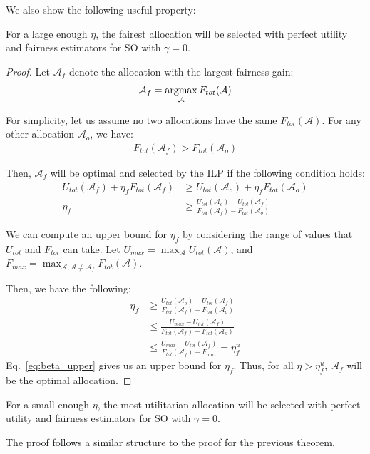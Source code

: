 We also show the following useful property:
\begin{theorem}
    For a large enough $\eta$, the fairest allocation will be selected with perfect utility and fairness estimators for SO with $\gamma=0$.
\end{theorem}
\begin{proof}
Let $\mathcal{A}_f$ denote the allocation with the largest fairness gain:
\begin{align*}
    \mathcal{A}_f = \argmax_\mathcal{A} F_{tot}(\mathcal{A}) 
\end{align*}

For simplicity, let us assume no two allocations have the same $F_{tot}(\mathcal{A})$. For any other allocation $\mathcal{A}_o$, we have:
\begin{align}
    F_{tot}(\mathcal{A}_f) > F_{tot}(\mathcal{A}_o)  
\end{align}

Then, $\mathcal{A}_f$ will be optimal and selected by the ILP if the following condition holds:
\begin{align}
  U_{tot}(\mathcal{A}_f) + \eta_f F_{tot}(\mathcal{A}_f) &\ge U_{tot}(\mathcal{A}_o) + \eta_f F_{tot}(\mathcal{A}_o)  \\
  \eta_f &\ge \frac{U_{tot}(\mathcal{A}_o) - U_{tot}(\mathcal{A}_f)}{F_{tot}(\mathcal{A}_f)- F_{tot}(\mathcal{A}_o)} 
\end{align}

We can compute an upper bound for $\eta_f$ by considering the range of values that $U_{tot}$ and $F_{tot}$ can take. Let $U_{max}=\max_\mathcal{A}U_{tot}(\mathcal{A})$, and $F_{max}=\max_{\mathcal{A}, \mathcal{A}\ne \mathcal{A}_f }F_{tot}(\mathcal{A})$.

Then, we have the following:
\begin{align}
    \eta_f &\ge \frac{U_{tot}(\mathcal{A}_o) - U_{tot}(\mathcal{A}_f)}{F_{tot}(\mathcal{A}_f)- F_{tot}(\mathcal{A}_o)}\\
    &\le \frac{U_{max} - U_{tot}(\mathcal{A}_f)}{F_{tot}(\mathcal{A}_f)- F_{tot}(\mathcal{A}_o)}\\
    &\le \frac{U_{max} - U_{tot}(\mathcal{A}_f)}{F_{tot}(\mathcal{A}_f)- F_{max}} = \eta_f^u \label{eq:beta_upper}
\end{align}
Eq.~\ref{eq:beta_upper} gives us an upper bound for $\eta_f$. Thus, for all $\eta>\eta_f^u$, $\mathcal{A}_f$ will be the optimal allocation.
\end{proof}
\begin{corollary}
    For a small enough $\eta$, the most utilitarian allocation will be selected with perfect utility and fairness estimators for SO with $\gamma=0$.
\end{corollary}
The proof follows a similar structure to the proof for the previous theorem.
